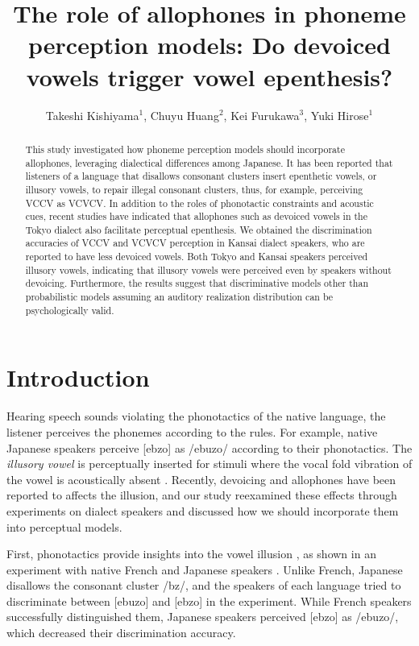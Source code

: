 \documentclass[a4paper,11pt,twocolumn]{article}
\title{The role of allophones in phoneme perception models: Do devoiced vowels trigger vowel epenthesis?}
\author{
    Takeshi Kishiyama$^1$,
    Chuyu Huang$^2$,
    Kei Furukawa$^3$,
    Yuki Hirose$^1$}
\begin{document}
\maketitle

\begin{abstract}
This study investigated how phoneme perception models should incorporate allophones, leveraging dialectical differences among Japanese. It has been reported that listeners of a language that disallows consonant clusters insert epenthetic vowels, or illusory vowels, to repair illegal consonant clusters, thus, for example, perceiving VCCV as VCVCV. In addition to the roles of phonotactic constraints and acoustic cues, recent studies have indicated that allophones such as devoiced vowels in the Tokyo dialect also facilitate perceptual epenthesis. We obtained the discrimination accuracies of VCCV and VCVCV perception in Kansai dialect speakers, who are reported to have less devoiced vowels. Both Tokyo and Kansai speakers perceived illusory vowels, indicating that illusory vowels were perceived even by speakers without devoicing. Furthermore, the results suggest that discriminative models other than probabilistic models assuming an auditory realization distribution can be psychologically valid.
\end{abstract}


\section{Introduction}

Hearing speech sounds violating the phonotactics of the native language, the listener perceives the phonemes according to the rules. For example, native Japanese speakers perceive [ebzo] as /ebuzo/ according to their phonotactics. The \textit{illusory vowel} is perceptually inserted for stimuli where the vocal fold vibration of the vowel is acoustically absent \cite{dupoux1999epentheticvi, dupoux2011illusory}. Recently, devoicing and allophones have been reported to affects the illusion, and our study reexamined these effects through experiments on dialect speakers and discussed how we should incorporate them into perceptual models.

First, phonotactics provide insights into the vowel illusion \cite{dupoux1999epentheticvi, halle2014special, monahan2009not, mattingley2015influence, guevara2017predicting, guevara2017epenthetic}, as shown in an experiment with native French and Japanese speakers \cite{dupoux1999epentheticvi}. Unlike French, Japanese disallows the consonant cluster /bz/, and the speakers of each language tried to discriminate between [ebuzo] and [ebzo] in the experiment. While French speakers successfully distinguished them, Japanese speakers perceived [ebzo] as /ebuzo/, which decreased their discrimination accuracy.
\end{document}
